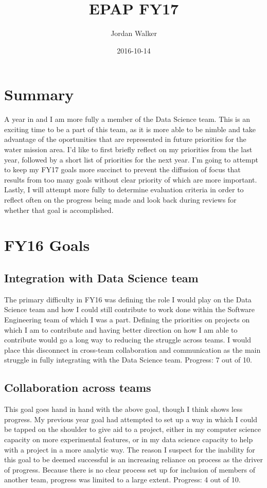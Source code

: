 \documentclass{article}
\title{EPAP FY17}
\author{Jordan Walker}
\date{2016-10-14}
\begin{document}
\maketitle

\section{Summary}

A year in and I am more fully a member of the Data Science team.
This is an exciting time to be a part of this team, as it is more able to be nimble and take advantage of the oportunities that are represented in future priorities for the water mission area.
I'd like to first briefly reflect on my priorities from the last year, followed by a short list of priorities for the next year.
I'm going to attempt to keep my FY17 goals more succinct to prevent the diffusion of focus that results from too many goals without clear priority of which are more important.
Lastly, I will attempt more fully to determine evaluation criteria in order to reflect often on the progress being made and look back during reviews for whether that goal is accomplished.

\section{FY16 Goals}

\subsection{Integration with Data Science team}

The primary difficulty in FY16 was defining the role I would play on the Data Science team and how I could still contribute to work done within the Software Engineering team of which I was a part.
Defining the priorities on projects on which I am to contribute and having better direction on how I am able to contribute would go a long way to reducing the struggle across teams.
I would place this disconnect in cross-team collaboration and communication as the main struggle in fully integrating with the Data Science team.
Progress: 7 out of 10.

\subsection{Collaboration across teams}

This goal goes hand in hand with the above goal, though I think shows less progress.
My previous year goal had attempted to set up a way in which I could be tapped on the shoulder to give aid to a project, either in my computer science capacity on more experimental features, or in my data science capacity to help with a project in a more analytic way.
The reason I suspect for the inability for this goal to be deemed successful is an increasing reliance on process as the driver of progress.
Because there is no clear process set up for inclusion of members of another team, progress was limited to a large extent.
Progress: 4 out of 10.
\end{document}
